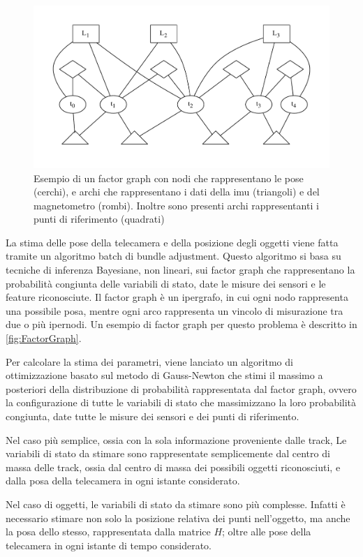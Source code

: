 \begin{figure}[ht]
  \includegraphics[width=\textwidth]{diagrammi/FactorGraph}
  \caption{Esempio di un factor graph con nodi che rappresentano le pose (cerchi), e archi che rappresentano i dati della imu (triangoli) e del magnetometro (rombi). Inoltre sono presenti archi rappresentanti i punti di riferimento (quadrati) }
  \label{fig:FactorGraph}
\end{figure}

La stima delle pose della telecamera e della posizione degli oggetti viene fatta tramite un algoritmo batch di bundle adjustment.
Questo algoritmo si basa su tecniche di inferenza Bayesiane, non lineari, sui factor graph che rappresentano la probabilità congiunta delle variabili di stato, date le misure dei sensori e le feature riconosciute.
Il factor graph è un ipergrafo, in cui ogni nodo rappresenta una possibile posa, mentre ogni arco rappresenta un vincolo di misurazione tra due o più ipernodi. Un esempio di factor graph per questo problema è descritto in \autoref{fig:FactorGraph}.

Per calcolare la stima dei parametri, viene lanciato un algoritmo di ottimizzazione basato sul metodo di Gauss-Newton che stimi il massimo a posteriori della distribuzione di probabilità rappresentata dal factor graph, ovvero la configurazione di tutte le variabili di stato che massimizzano la loro probabilità congiunta, date tutte le misure dei sensori e dei punti di riferimento.

Nel caso più semplice, ossia con la sola informazione proveniente dalle track, Le variabili di stato da stimare sono rappresentate semplicemente dal centro di massa delle track, ossia dal centro di massa dei possibili oggetti riconosciuti, e dalla posa della telecamera in ogni istante considerato.

Nel caso di oggetti, le variabili di stato da stimare sono più complesse. Infatti è necessario stimare non solo la posizione relativa dei punti nell'oggetto, ma anche la posa dello stesso, rappresentata dalla matrice $H$; oltre alle pose della telecamera in ogni istante di tempo considerato.


